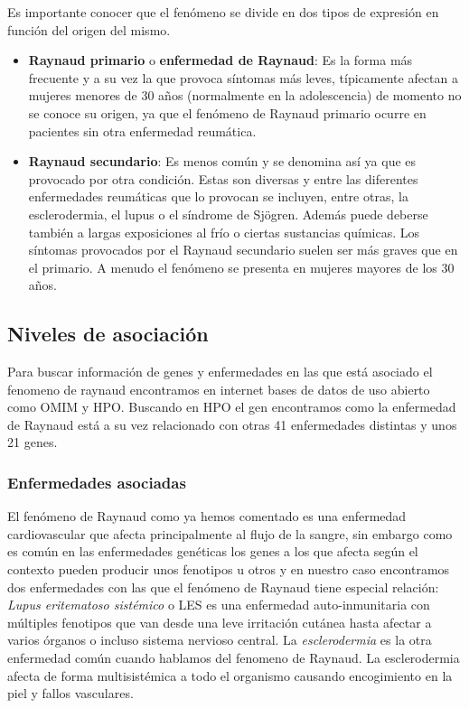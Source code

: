 Es importante conocer que el fenómeno se divide en dos tipos de expresión en función del origen del mismo.
\begin{itemize}
	\item \textbf{Raynaud primario} o \textbf{enfermedad de Raynaud}: Es la forma más frecuente y a su vez la que provoca síntomas más leves, típicamente afectan a mujeres menores de 30 años (normalmente en la adolescencia) de momento no se conoce su origen, ya que el fenómeno de Raynaud primario ocurre en pacientes sin otra enfermedad reumática. \cite{RaynaudFen}
	
	\item \textbf{Raynaud secundario}: Es menos común y se denomina así ya que es provocado por otra condición. Estas son diversas y entre las diferentes enfermedades reumáticas que lo provocan se incluyen, entre otras, la esclerodermia, el lupus o el síndrome de Sjögren. Además puede deberse también a largas exposiciones al frío o ciertas sustancias químicas. Los síntomas provocados por el Raynaud secundario suelen ser más graves que en el primario. A menudo el fenómeno se presenta en mujeres mayores de los 30 años. \cite{RaynaudClass}
\end{itemize}

\subsection{Niveles de asociación}

Para buscar información de genes y enfermedades en las que está asociado el fenomeno de raynaud encontramos en internet bases de datos de uso abierto como OMIM y HPO. Buscando en HPO el gen encontramos como la enfermedad de Raynaud está a su vez relacionado con otras 41 enfermedades distintas y unos 21 genes.

\subsubsection{Enfermedades asociadas}

El fenómeno de Raynaud como ya hemos comentado es una enfermedad cardiovascular que afecta principalmente al flujo de la sangre, sin embargo como es común en las enfermedades genéticas los genes a los que afecta según el contexto pueden producir unos fenotipos u otros y en nuestro caso encontramos dos enfermedades con las que el fenómeno de Raynaud tiene especial relación: \textit{Lupus eritematoso sistémico} \cite{Kuhn2022} o LES es una enfermedad auto-inmunitaria con múltiples fenotipos que van desde una leve irritación cutánea hasta afectar a varios órganos o incluso sistema nervioso central. La \textit{esclerodermia} \cite{Mohameden2022} es la otra enfermedad común cuando hablamos del fenomeno de Raynaud. La esclerodermia afecta de forma multisistémica a todo el organismo causando encogimiento en la piel y fallos vasculares.
	
